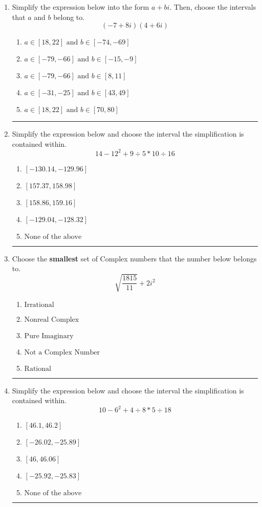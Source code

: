 \documentclass[14pt]{extbook}
\newcommand{\litem}[1]{\item#1\hspace*{-1cm}\rule{\textwidth}{0.4pt}}
\begin{document}
\begin{enumerate}
{\begin{enumerate}[label=\Alph*.]
\end{enumerate} }
\litem{
Simplify the expression below into the form $a+bi$. Then, choose the intervals that $a$ and $b$ belong to.\[ (-7 + 8 i)(4 + 6 i) \]\begin{enumerate}[label=\Alph*.]
\item \( a \in [18, 22] \text{ and } b \in [-74, -69] \)
\item \( a \in [-79, -66] \text{ and } b \in [-15, -9] \)
\item \( a \in [-79, -66] \text{ and } b \in [8, 11] \)
\item \( a \in [-31, -25] \text{ and } b \in [43, 49] \)
\item \( a \in [18, 22] \text{ and } b \in [70, 80] \)

\end{enumerate} }
\litem{
Simplify the expression below and choose the interval the simplification is contained within.\[ 14 - 12^2 + 9 \div 5 * 10 \div 16 \]\begin{enumerate}[label=\Alph*.]
\item \( [-130.14, -129.96] \)
\item \( [157.37, 158.98] \)
\item \( [158.86, 159.16] \)
\item \( [-129.04, -128.32] \)
\item \( \text{None of the above} \)

\end{enumerate} }
\litem{
Choose the \textbf{smallest} set of Complex numbers that the number below belongs to.\[ \sqrt{\frac{1815}{11}}+2i^2 \]\begin{enumerate}[label=\Alph*.]
\item \( \text{Irrational} \)
\item \( \text{Nonreal Complex} \)
\item \( \text{Pure Imaginary} \)
\item \( \text{Not a Complex Number} \)
\item \( \text{Rational} \)

\end{enumerate} }
\litem{
Simplify the expression below and choose the interval the simplification is contained within.\[ 10 - 6^2 + 4 \div 8 * 5 \div 18 \]\begin{enumerate}[label=\Alph*.]
\item \( [46.1, 46.2] \)
\item \( [-26.02, -25.89] \)
\item \( [46, 46.06] \)
\item \( [-25.92, -25.83] \)
\item \( \text{None of the above} \)


\end{enumerate}}
\end{enumerate}
\end{document}
